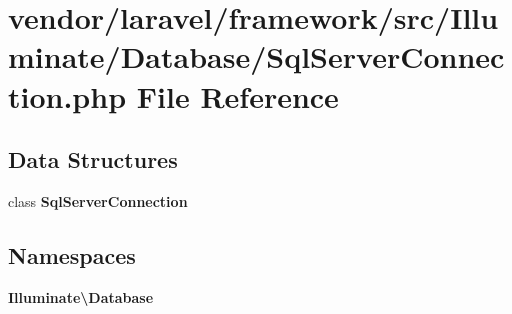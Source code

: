\section{vendor/laravel/framework/src/\+Illuminate/\+Database/\+Sql\+Server\+Connection.php File Reference}
\label{_sql_server_connection_8php}
\subsection*{Data Structures}
\begin{DoxyCompactItemize}
\item 
class {\bf Sql\+Server\+Connection}
\end{DoxyCompactItemize}
\subsection*{Namespaces}
\begin{DoxyCompactItemize}
\item 
 {\bf Illuminate\textbackslash{}\+Database}
\end{DoxyCompactItemize}

